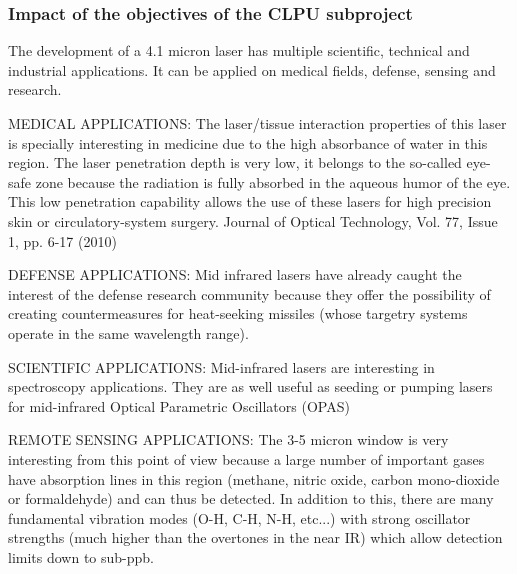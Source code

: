 
\subsubsection*{Impact of the objectives of the CLPU subproject}

The development of a 4.1 micron laser has multiple scientific, technical and industrial applications. It can be applied on medical fields, defense, sensing and research. 

MEDICAL APPLICATIONS: The laser/tissue interaction properties of this laser is specially interesting in medicine due to the high absorbance of water in this region. The laser penetration depth is very low, it belongs to the so-called eye-safe zone because the radiation is fully absorbed in the aqueous humor of the eye. This low penetration capability allows the use of these lasers for high precision skin or circulatory-system surgery.
Journal of Optical Technology, Vol. 77, Issue 1, pp. 6-17 (2010)

DEFENSE APPLICATIONS: Mid infrared lasers have already caught the interest of the defense research community because they offer the possibility of creating countermeasures for heat-seeking missiles (whose targetry systems operate in the same wavelength range). 

SCIENTIFIC APPLICATIONS: Mid-infrared lasers are interesting in spectroscopy applications. They are as well useful as seeding or pumping lasers for mid-infrared Optical Parametric Oscillators (OPAS) 

REMOTE SENSING APPLICATIONS: The 3-5 micron window is very interesting from this point of view because a large number of important gases have absorption lines in this region (methane, nitric oxide, carbon mono-dioxide or formaldehyde) and can thus be detected. In addition to this, there are many fundamental vibration modes (O-H, C-H, N-H, etc...) with strong oscillator strengths (much higher than the overtones in the near IR) which allow detection limits down to sub-ppb. 
